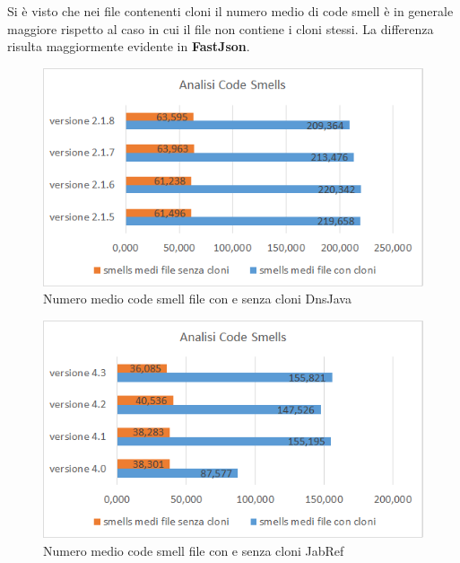 Si è visto che nei file contenenti cloni il numero medio di code smell è in generale maggiore rispetto al caso in cui il file non contiene i cloni stessi. La differenza risulta maggiormente evidente in \textbf{FastJson}.\\
\begin{figure}[h]
	\centering
	\includegraphics[scale=0.75, trim = 0cm 0cm 0cm 0cm, clip=true]{Grafici_dnsJava/CodeSmells.png}
	\caption{Numero medio code smell file con e senza cloni DnsJava}
	\label{fig:codeSmellDnsJava}	
\end{figure}
\begin{figure}[h]
	\centering
	\includegraphics[scale=0.75, trim = 0cm 0cm 0cm 0cm, clip=true]{Grafici_jabRef/CodeSmells.png}
	\caption{Numero medio code smell file con e senza cloni JabRef}
	\label{fig:codeSmellJabRef}
\end{figure}

